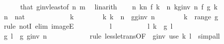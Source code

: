 \begin{isabellebody}
\ \ \ \ \isamarkupfalse%
\ that\ g{\isacharunderscore}{\kern0pt}inv{\isacharunderscore}{\kern0pt}least{\isacharbrackleft}{\kern0pt}of\ n\ m{\isacharbrackright}{\kern0pt}\ \isamarkupfalse%
\ linarith\isanewline
\ \ \isamarkupfalse%
\ {\isachardoublequoteopen}{\isacharparenleft}{\kern0pt}{\isasymlambda}n{\isachardot}{\kern0pt}\ {\isasymSum}k{\isacharless}{\kern0pt}n{\isachardot}{\kern0pt}\ f\ k{\isacharparenright}{\kern0pt}\ {\isacharequal}{\kern0pt}\ {\isacharparenleft}{\kern0pt}{\isasymlambda}n{\isachardot}{\kern0pt}\ {\isasymSum}k{\isacharless}{\kern0pt}g{\isacharunderscore}{\kern0pt}inv\ n{\isachardot}{\kern0pt}\ f\ {\isacharparenleft}{\kern0pt}g\ k{\isacharparenright}{\kern0pt}{\isacharparenright}{\kern0pt}{\isachardoublequoteclose}\isanewline
\ \ \isamarkupfalse%
\isanewline
\ \ \ \ \isamarkupfalse%
\ n\ {\isacharcolon}{\kern0pt}{\isacharcolon}{\kern0pt}\ nat\isanewline
\ \ \ \ \isacommand{{\isacharbraceleft}{\kern0pt}}\isamarkupfalse%
\isanewline
\ \ \ \ \ \ \isamarkupfalse%
\ k\isanewline
\ \ \ \ \ \ \isamarkupfalse%
\ k{\isacharcolon}{\kern0pt}\ {\isachardoublequoteopen}k\ {\isasymin}\ {\isacharbraceleft}{\kern0pt}{\isachardot}{\kern0pt}{\isachardot}{\kern0pt}{\isacharless}{\kern0pt}n{\isacharbraceright}{\kern0pt}\ {\isacharminus}{\kern0pt}\ g{\isacharbackquote}{\kern0pt}{\isacharbraceleft}{\kern0pt}{\isachardot}{\kern0pt}{\isachardot}{\kern0pt}{\isacharless}{\kern0pt}g{\isacharunderscore}{\kern0pt}inv\ n{\isacharbraceright}{\kern0pt}{\isachardoublequoteclose}\isanewline
\ \ \ \ \ \ \isamarkupfalse%
\ {\isachardoublequoteopen}k\ {\isasymnotin}\ range\ g{\isachardoublequoteclose}\isanewline
\ \ \ \ \ \ \isamarkupfalse%
\ {\isacharparenleft}{\kern0pt}rule\ notI{\isacharcomma}{\kern0pt}\ elim\ imageE{\isacharparenright}{\kern0pt}\isanewline
\ \ \ \ \ \ \ \ \isamarkupfalse%
\ l\isanewline
\ \ \ \ \ \ \ \ \isamarkupfalse%
\ l{\isacharcolon}{\kern0pt}\ {\isachardoublequoteopen}k\ {\isacharequal}{\kern0pt}\ g\ l{\isachardoublequoteclose}\isanewline
\ \ \ \ \ \ \ \ \isamarkupfalse%
\ {\isachardoublequoteopen}g\ l\ {\isacharless}{\kern0pt}\ g\ {\isacharparenleft}{\kern0pt}g{\isacharunderscore}{\kern0pt}inv\ n{\isacharparenright}{\kern0pt}{\isachardoublequoteclose}\isanewline
\ \ \ \ \ \ \ \ \ \ \isamarkupfalse%
\ {\isacharparenleft}{\kern0pt}rule\ less{\isacharunderscore}{\kern0pt}le{\isacharunderscore}{\kern0pt}trans{\isacharbrackleft}{\kern0pt}OF\ {\isacharunderscore}{\kern0pt}\ g{\isacharunderscore}{\kern0pt}inv{\isacharbrackright}{\kern0pt}{\isacharparenright}{\kern0pt}\ {\isacharparenleft}{\kern0pt}use\ k\ l\ \ simp{\isacharunderscore}{\kern0pt}all{\isacharparenright}{\kern0pt}\isanewline

\end{isabellebody}

